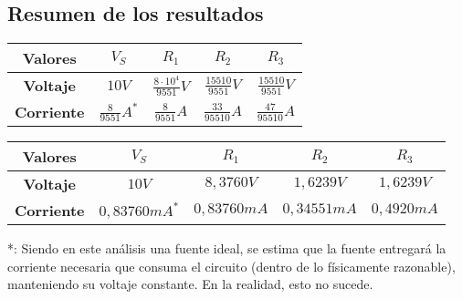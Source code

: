     \subsection{Resumen de los resultados}
    \begin{center}
        \small
        \begin{tabular}{| c c c c c |}
            \hline
            \multicolumn{1}{|m{1.2cm}}{\centering\textbf{Valores}} &
            \multicolumn{1}{m{1.2cm}}{\centering\textbf{$V_S$}} &
            \multicolumn{1}{m{1.2cm}}{\centering\textbf{$R_1$}} &
            \multicolumn{1}{m{1.2cm}}{\centering\textbf{$R_2$}} &
            \multicolumn{1}{m{1.2cm}|}{\centering\textbf{$R_3$}} \\
            \hline
            \multicolumn{1}{|m{1.2cm}|}{\centering\textbf{Voltaje}} &
            \multicolumn{1}{m{1.2cm}}{\centering$10V$} &
            \multicolumn{1}{m{1.2cm}}{\centering$\frac{8\cdot 10^{4}}{9551}V$} &
            \multicolumn{1}{m{1.2cm}}{\centering$\frac{15510}{9551}V$} &
            \multicolumn{1}{m{1.2cm}|}{\centering$\frac{15510}{9551}V$} \\
            \multicolumn{1}{|m{1.2cm}|}{\centering\textbf{Corriente}} &
            \multicolumn{1}{m{1.2cm}}{\centering$\frac{8}{9551}A^*$} &
            \multicolumn{1}{m{1.2cm}}{\centering$\frac{8}{9551}A$} &
            \multicolumn{1}{m{1.2cm}}{\centering$\frac{33}{95510}A$} &
            \multicolumn{1}{m{1.2cm}|}{\centering$\frac{47}{95510}A$} \\
            \hline
        \end{tabular} 
    \end{center}
    \begin{center}
        \footnotesize
        \begin{tabular}{| c c c c c |}
            \hline
            \multicolumn{1}{|m{1.25cm}}{\centering\textbf{Valores}} &
            \multicolumn{1}{m{1.25cm}}{\centering\textbf{$V_S$}} &
            \multicolumn{1}{m{1.25cm}}{\centering\textbf{$R_1$}} &
            \multicolumn{1}{m{1.25cm}}{\centering\textbf{$R_2$}} &
            \multicolumn{1}{m{1.25cm}|}{\centering\textbf{$R_3$}} \\
            \hline
            \multicolumn{1}{|m{1.25cm}|}{\centering\textbf{Voltaje}} &
            \multicolumn{1}{m{1.25cm}}{\centering$10V$} &
            \multicolumn{1}{m{1.25cm}}{\centering$8,3760V$} &
            \multicolumn{1}{m{1.25cm}}{\centering$1,6239V$} &
            \multicolumn{1}{m{1.25cm}|}{\centering$1,6239V$} \\
            \multicolumn{1}{|m{1.25cm}|}{\centering\textbf{Corriente}} &
            \multicolumn{1}{m{1.25cm}}{\centering$0,83760 mA^*$} &
            \multicolumn{1}{m{1.25cm}}{\centering$0,83760  mA$} &
            \multicolumn{1}{m{1.25cm}}{\centering$0,34551  mA$} &
            \multicolumn{1}{m{1.25cm}|}{\centering$0,4920 mA$} \\
            \hline
        \end{tabular} 
    \end{center}
   *: Siendo en este análisis una fuente ideal, se estima que la fuente entregará la corriente necesaria que consuma el circuito (dentro de lo físicamente razonable), manteniendo su voltaje constante. En la realidad, esto no sucede.

